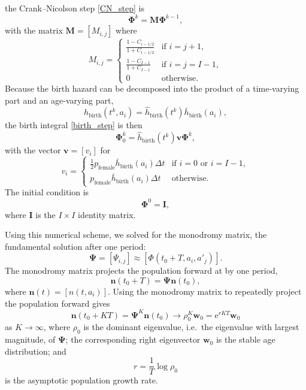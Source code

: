 \documentclass[12pt, UKenglish]{article}  %
\renewcommand{\vec}[1]{\mathbf{#1}}
\newcommand{\mat}[1]{\mathbf{#1}}
\newcommand{\me}{\mathrm{e}}
\begin{document}
the Crank--Nicolson step \eqref{CN_step} is
\begin{equation}
  \mat{\Phi}^k = \mat{M} \mat{\Phi}^{k - 1},
\end{equation}
with the matrix $\mat{M} = [M_{i, j}]$ where
\begin{equation}
  M_{i, j} =
  \begin{cases}
    \frac{1 - C_{i - 1 / 2}}{1 + C_{i - 1 / 2}}
    & \text{if $i = j + 1$}, \\
    \frac{1 - C_{I - 1}}{1 + C_{I - 1}} & \text{if $i = j = I - 1$}, \\
    0 & \text{otherwise}.
  \end{cases}
\end{equation}
Because the birth hazard can be decomposed into the product of a
time-varying part and an age-varying part,
\begin{equation}
  h_{\text{birth}}(t^k, a_i)
  = \hat{h}_{\text{birth}}(t^k) \bar{h}_{\text{birth}}(a_i),
\end{equation}
the birth integral \eqref{birth_step} is then
\begin{equation}
  \mat{\Phi}_0^k = \hat{h}_{\text{birth}}(t^k) \vec{v} \mat{\Phi}^k,
\end{equation}
with the vector $\vec{v} = [v_i]$ for
\begin{equation}
  v_i =
  \begin{cases}
    \frac{1}{2} p_{\text{female}} \bar{h}_{\text{birth}}(a_i) \Delta t
    & \text{if $i = 0$ or $i = I - 1$}, \\
    p_{\text{female}} \bar{h}_{\text{birth}}(a_i) \Delta t
    & \text{otherwise}.
  \end{cases}
\end{equation}
The initial condition is
\begin{equation}
  \mat{\Phi}^0 = \mat{I},
\end{equation}
where $\mat{I}$ is the $I \times I$ identity matrix.

Using this numerical scheme, we solved for the monodromy matrix, the
fundamental solution after one period:
\begin{equation}
  \mat{\Psi} = [\Psi_{i, j}] \approx [\Phi(t_0 + T, a_i, a'_j)].
\end{equation}
The monodromy matrix projects the population forward at by one period,
\begin{equation}
  \vec{n}(t_0 + T) = \mat{\Psi} \vec{n}(t_0),
\end{equation}
where $\vec{n}(t) = [n(t, a_i)]$.
Using the monodromy matrix to repeatedly project the population
forward gives
\begin{equation}
  \vec{n}(t_0 + K T)
  = \mat{\Psi}^K \vec{n}(t_0)
  \to \rho_0^K \vec{w}_0
  = \me^{r K T} \vec{w}_0
\end{equation}
as $K \to \infty$,
where $\rho_0$ is the dominant eigenvalue, i.e.~the eigenvalue with
largest magnitude, of $\mat{\Psi}$;
the corresponding right eigenvector $\vec{w}_0$ is the stable age
distribution; and
\begin{equation}
  r = \frac{1}{T} \log \rho_0
\end{equation}
is the asymptotic population growth rate.
\end{document}
